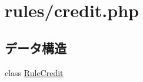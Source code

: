 \hypertarget{credit_8php}{
\section{rules/credit.php}
\label{credit_8php}
}
\subsection*{データ構造}
\begin{DoxyCompactItemize}
\item 
class \hyperlink{class_rule_credit}{\-Rule\-Credit}
\end{DoxyCompactItemize}
